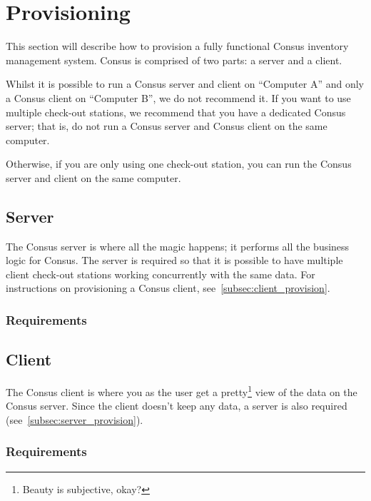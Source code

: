 \section{Provisioning}
\label{sec:provisioning}

This section will describe how to provision a fully functional Consus inventory management system.
Consus is comprised of two parts: a server and a client.

Whilst it is possible to run a Consus server and client on ``Computer A'' and only a Consus client on ``Computer B'', we do not recommend it. %
If you want to use multiple check-out stations, we recommend that you have a dedicated Consus server; that is, do not run a Consus server and Consus client on the same computer.

Otherwise, if you are only using one check-out station, you can run the Consus server and client on the same computer.

\subsection{Server}
\label{subsec:server_provision}

The Consus server is where all the magic happens; it performs all the business logic for Consus.
The server is required so that it is possible to have multiple client check-out stations working concurrently with the same data.
For instructions on provisioning a Consus client, see~\autoref{subsec:client_provision}.

\subsubsection{Requirements}

\blindtext%

\subsection{Client}
\label{subsec:client_provision}

The Consus client is where you as the user get a pretty\footnote{Beauty is subjective, okay?} view of the data on the Consus server.
Since the client doesn't keep any data, a server is also required (see~\autoref{subsec:server_provision}).

\subsubsection{Requirements}

\blindtext%
